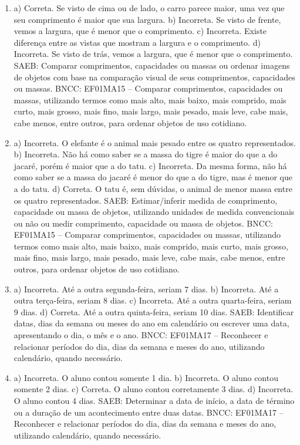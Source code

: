 \begin{enumerate}
\item
a) Correta. Se visto de cima ou de lado, o carro parece maior, uma vez
que seu comprimento é maior que sua largura.
b) Incorreta. Se visto de frente, vemos a largura, que é menor que o
comprimento.
c) Incorreta. Existe diferença entre as vistas que mostram a largura e o
comprimento.
d) Incorreta. Se visto de trás, vemos a largura, que é menor que o
comprimento.
SAEB: Comparar comprimentos, capacidades ou massas ou ordenar
imagens de objetos com base na comparação visual de seus comprimentos,
capacidades ou massas.
BNCC: EF01MA15 -- Comparar comprimentos, capacidades ou massas,
utilizando termos como mais alto, mais baixo, mais comprido, mais curto,
mais grosso, mais fino, mais largo, mais pesado, mais leve, cabe mais,
cabe menos, entre outros, para ordenar objetos de uso cotidiano.

\item
a) Incorreta. O elefante é o animal mais pesado entre os quatro representados.
b) Incorreta. Não há como saber se a massa do tigre é maior do que a do
jacaré, porém é maior que a do tatu.
c) Incorreta. Da mesma forma, não há como saber se a massa do jacaré é
menor do que a do tigre, mas é menor que a do tatu.
d) Correta. O tatu é, sem dúvidas, o animal de menor massa entre os
quatro representados.
SAEB: Estimar/inferir medida de comprimento, capacidade ou massa
de objetos, utilizando unidades de medida convencionais ou não ou medir
comprimento, capacidade ou massa de objetos.
BNCC: EF01MA15 -- Comparar comprimentos, capacidades ou massas,
utilizando termos como mais alto, mais baixo, mais comprido, mais curto,
mais grosso, mais fino, mais largo, mais pesado, mais leve, cabe mais,
cabe menos, entre outros, para ordenar objetos de uso cotidiano.

\item
a) Incorreta. Até a outra segunda-feira, seriam 7 dias.
b) Incorreta. Até a outra terça-feira, seriam 8 dias.
c) Incorreta. Até a outra quarta-feira, seriam 9 dias.
d) Correta. Até a outra quinta-feira, seriam 10 dias.
SAEB: Identificar datas, dias da semana ou meses do ano em
calendário ou escrever uma data, apresentando o dia, o mês e o ano.
BNCC: EF01MA17 -- Reconhecer e relacionar períodos do dia, dias da semana
e meses do ano, utilizando calendário, quando necessário.

\item
a) Incorreta. O aluno contou somente 1 dia.
b) Incorreta. O aluno contou somente 2 dias.
c) Correta. O aluno contou corretamente 3 dias.
d) Incorreta. O aluno contou 4 dias.
SAEB: Determinar a data de início, a data de término ou a
duração de um acontecimento entre duas datas.
BNCC: EF01MA17 -- Reconhecer e relacionar períodos do dia, dias da semana
e meses do ano, utilizando calendário, quando necessário.


\end{enumerate}
